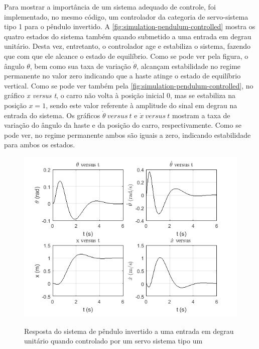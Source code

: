 Para mostrar a importância de um sistema adequado de controle, foi implementado, no mesmo código, um controlador da categoria de servo-sistema tipo 1 para o pêndulo invertido. A \autoref{fig:simulation-pendulum-controlled} mostra os quatro estados do sistema também quando submetido a uma entrada em degrau unitário. Desta vez, entretanto, o controlador age e estabiliza o sistema, fazendo que com que ele alcance o estado de equilíbrio. Como se pode ver pela figura, o ângulo $\theta$, bem como sua taxa de variação $\dot{\theta}$, alcançam estabilidade no regime permanente no valor zero indicando que a haste atinge o estado de equilíbrio vertical. Como se pode ver também pela \autoref{fig:simulation-pendulum-controlled}, no gráfico \textit{x versus t}, o carro não volta à posição inicial 0, mas se estabiliza na posição $x=1$, sendo este valor referente à amplitude do sinal em degrau na entrada do sistema. Os gráficos $\dot{\theta}\ versus\ t$ e $\dot{x}\ versus\ t$ mostram a taxa de variação do ângulo da haste e da posição do carro, respectivamente. Como se pode ver, no regime permanente ambos são iguais a zero, indicando estabilidade para ambos os estados.

\begin{figure}[!htb]
    \centering
    \caption{Resposta do sistema de pêndulo invertido a uma entrada em degrau unitário quando controlado por um servo sistema tipo um}
    \includegraphics[width=1\textwidth]{./04-figuras/matlab_figuras_pendulo/sistema_com_controle_estados_black}
    \label{fig:simulation-pendulum-controlled}
\end{figure}